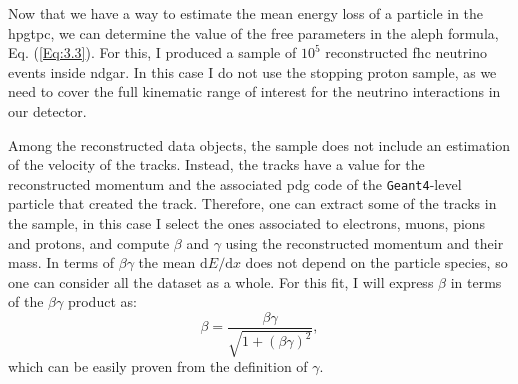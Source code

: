 Now that we have a way to estimate the mean energy loss of a particle in the \gls{hpgtpc}, we can determine the value of the free parameters in the \gls{aleph} formula, Eq. (\ref{Eq:3.3}). For this, I produced a sample of $10^{5}$ reconstructed \gls{fhc} neutrino events inside \gls{ndgar}. In this case I do not use the stopping proton sample, as we need to cover the full kinematic range of interest for the neutrino interactions in our detector.

Among the reconstructed data objects, the sample does not include an estimation of the velocity of the tracks. Instead, the tracks have a value for the reconstructed momentum and the associated \gls{pdg} code of the \texttt{Geant4}-level particle that created the track. Therefore, one can extract some of the tracks in the sample, in this case I select the ones associated to electrons, muons, pions and protons, and compute $\beta$ and $\gamma$ using the reconstructed momentum and their mass. In terms of $\beta\gamma$ the mean $\mathrm{d}E/\mathrm{d}x$ does not depend on the particle species, so one can consider all the dataset as a whole. For this fit, I will express $\beta$ in terms of the $\beta\gamma$ product as:
\begin{equation}
    \beta = \frac{\beta\gamma}{\sqrt{1+(\beta\gamma)^{2}}},
\end{equation}
which can be easily proven from the definition of $\gamma$.

